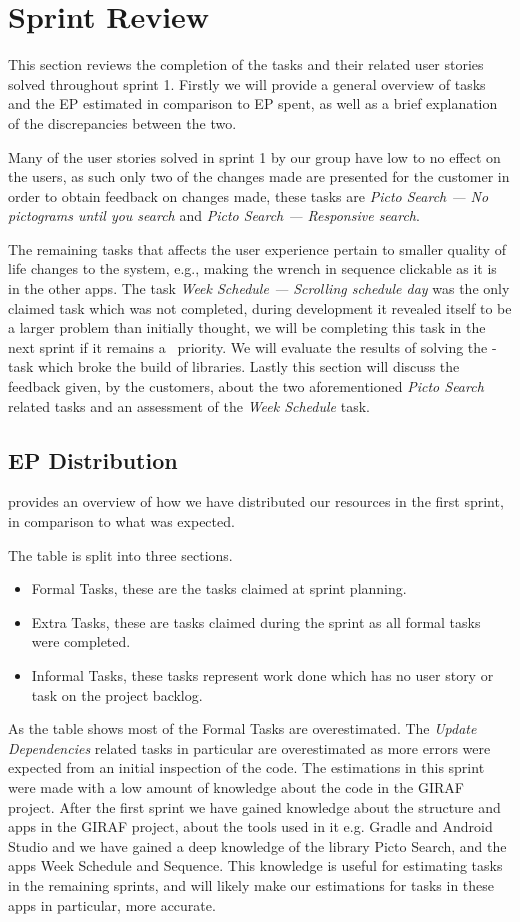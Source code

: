 \section{Sprint Review}\label{s1rev}
This section reviews the completion of the tasks and their related user stories solved throughout sprint 1.
Firstly we will provide a general overview of tasks and the EP estimated in comparison to EP spent, as well as a brief explanation of the discrepancies between the two.

Many of the user stories solved in sprint 1 by our group have low to no effect on the users, as such only two of the changes made are presented for the customer in order to obtain feedback on changes made, these tasks are \textit{Picto Search --- No pictograms until you search} and \textit{Picto Search --- Responsive search}.

The remaining tasks that affects the user experience pertain to smaller quality of life changes to the system, e.g., making the wrench in sequence clickable as it is in the other apps.
The task \textit{Week Schedule --- Scrolling schedule day} was the only claimed task which was not completed, during development it revealed itself to be a larger problem than initially thought, we will be completing this task in the next sprint if it remains a \phigh~priority.
We will evaluate the results of solving the \pblocking-task which broke the build of libraries.
Lastly this section will discuss the feedback given, by the customers, about the two aforementioned \textit{Picto Search} related tasks and an assessment of the \textit{Week Schedule} task.

\subsection{EP Distribution}
 provides an overview of how we have distributed our resources in the first sprint, in comparison to what was expected.

The table is split into three sections.
\begin{itemize}
    \item Formal Tasks, these are the tasks claimed at sprint planning.
    \item Extra Tasks, these are tasks claimed during the sprint as all formal tasks were completed.
    \item Informal Tasks, these tasks represent work done which has no user story or task on the project backlog.
\end{itemize}
As the table shows most of the Formal Tasks are overestimated.
The \textit{Update Dependencies} related tasks in particular are overestimated as more errors were expected from an initial inspection of the code.
The estimations in this sprint were made with a low amount of knowledge about the code in the GIRAF project.
After the first sprint we have gained knowledge about the structure and apps in the GIRAF project, about the tools used in it e.g. Gradle and Android Studio and we have gained a deep knowledge of the library Picto Search, and the apps Week Schedule and Sequence.
This knowledge is useful for estimating tasks in the remaining sprints, and will likely make our estimations for tasks in these apps in particular, more accurate.

